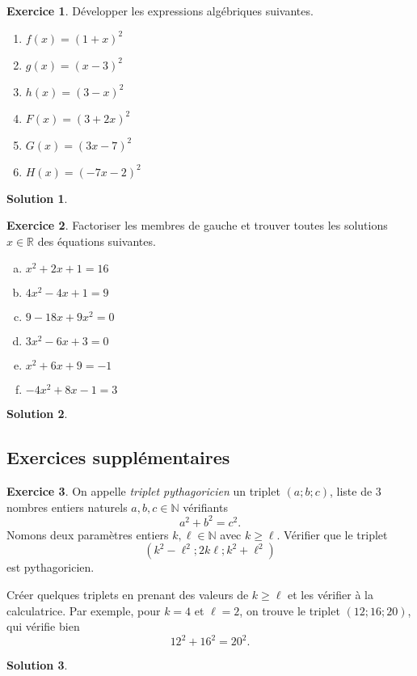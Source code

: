 \documentclass[a4paper, 14pt]{extarticle}
\theoremstyle{plain}
\newtheorem*{sol}{Solution}
\theoremstyle{definition}
\newtheorem{ex}{Exercice}
\newcommand{\R}{\mathbb{R}}
\newcommand{\N}{\mathbb{N}}
\newif\ifsolutions
\newcommand{\exe}[2]{
		\begin{ex} #1  \end{ex}
		\begin{sol} #2 \end{sol}
	}
\newcommand{\exe}[2]{
		\begin{ex} #1  \end{ex}
	}
\begin{document}
\pagestyle{fancy}
\fancyhead[C]{\textbf{Fonctions 2 \ifsolutions -- Solutions  \fi}}
\fancyhead[R]{\today}

	\exe{
		Développer les expressions algébriques suivantes.
			\begin{multicols}{2}
			\begin{enumerate}[$\bullet$]
				\item $f(x) = (1+x)^2$
				\item $g(x) = (x-3)^2$
				\item $h(x) = (3-x)^2$
				\item $F(x) = (3 + 2x)^2$
				\item $G(x) = (3x - 7)^2$
				\item $H(x) = (-7x - 2)^2$
			\end{enumerate}
			\end{multicols}
	}{}
	
	\exe{
		Factoriser les membres de gauche et trouver toutes les solutions $x\in\R$ des équations suivantes.
			\begin{multicols}{2}
			\begin{enumerate}[a)]
				\item $x^2 + 2x + 1 = 16$
				\item $4x^2 - 4x + 1 = 9$
				\item $9 - 18x + 9x^2 = 0$
				\item $3x^2 - 6x + 3 = 0$
				\item $x^2 +6x + 9 = -1$
				\item $-4x^2 + 8x - 1 = 3$
			\end{enumerate}
			\end{multicols}
	}{}
	
	\subsection*{Exercices supplémentaires}
	
	\exe{
		On appelle \emph{triplet pythagoricien} un triplet $(a ; b ; c)$, liste de $3$ nombres entiers naturels $a,b,c\in\N$ vérifiants
			\[ a^2 + b^2 = c^2. \]
		Nomons deux paramètres entiers $k,\ell\in\N$ avec $k\geq \ell$.
		Vérifier que le triplet
			\[ (k^2 - \ell^2 ; 2k\ell ; k^2 + \ell^2) \]
		est pythagoricien.
		
		Créer quelques triplets en prenant des valeurs de $k \geq \ell$ et les vérifier à la calculatrice.
		Par exemple, pour $k=4$ et $\ell=2$, on trouve le triplet $(12 ; 16 ; 20)$, qui vérifie bien
			\[ 12^2 + 16^2 = 20^2. \] 
	}{}
	
\end{document}
